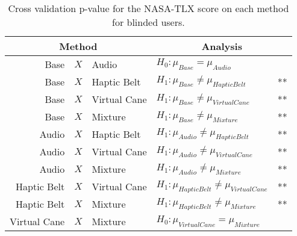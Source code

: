 
\begin{table}[!htb]
\centering
\caption{Cross validation p-value for the NASA-TLX score on each method for blinded users.}
\label{tab:lsd_nasa_avg_two_way_blind}
\begin{tabular}{rcllr}
\toprule
      \multicolumn{3}{c}{Method} &                          \multicolumn{2}{c}{Analysis} \\
\midrule
              Base & $X$ & Audio &                   $H_0 : \mu_{Base} = \mu_{Audio}$ &  \\
        Base & $X$ & Haptic Belt &         $H_1 : \mu_{Base} \ne \mu_{Haptic Belt}$ & ** \\
       Base & $X$ & Virtual Cane &        $H_1 : \mu_{Base} \ne \mu_{Virtual Cane}$ & ** \\
            Base & $X$ & Mixture &             $H_1 : \mu_{Base} \ne \mu_{Mixture}$ & ** \\
       Audio & $X$ & Haptic Belt &        $H_1 : \mu_{Audio} \ne \mu_{Haptic Belt}$ & ** \\
      Audio & $X$ & Virtual Cane &       $H_1 : \mu_{Audio} \ne \mu_{Virtual Cane}$ & ** \\
           Audio & $X$ & Mixture &            $H_1 : \mu_{Audio} \ne \mu_{Mixture}$ & ** \\
Haptic Belt & $X$ & Virtual Cane & $H_1 : \mu_{Haptic Belt} \ne \mu_{Virtual Cane}$ & ** \\
     Haptic Belt & $X$ & Mixture &      $H_1 : \mu_{Haptic Belt} \ne \mu_{Mixture}$ & ** \\
    Virtual Cane & $X$ & Mixture &         $H_0 : \mu_{Virtual Cane} = \mu_{Mixture}$ &  \\
\bottomrule
\end{tabular}
\end{table}


